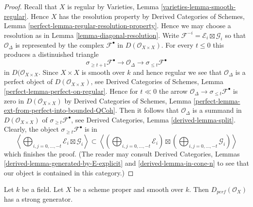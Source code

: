 \begin{proof}
Recall that $X$ is regular by
Varieties, Lemma \ref{varieties-lemma-smooth-regular}.
Hence $X$ has the resolution property by
Derived Categories of Schemes, Lemma
\ref{perfect-lemma-regular-resolution-property}.
Hence we may choose a resolution as in Lemma \ref{lemma-diagonal-resolution}.
Write $\mathcal{F}^{-i} = \mathcal{E}_i \boxtimes \mathcal{G}_i$
so that $\mathcal{O}_\Delta$ is represented by the complex
$\mathcal{F}^\bullet$ in $D(\mathcal{O}_{X \times X})$.
For every $t \leq 0$ this produces a distinuished triangle
$$
\sigma_{\geq t + 1}\mathcal{F}^\bullet \to
\mathcal{O}_\Delta \to \sigma_{\leq t}\mathcal{F}^\bullet
$$
in $D(\mathcal{O}_{X \times X}$. Since $X \times X$ is smooth over $k$
and hence regular we see that $\mathcal{O}_\Delta$ is a perfect object of
$D(\mathcal{O}_{X \times X})$, see
Derived Categories of Schemes, Lemma \ref{perfect-lemma-perfect-on-regular}.
Hence for $t \ll 0$ the arrow
$\mathcal{O}_\Delta \to \sigma_{\leq t}\mathcal{F}^\bullet$
is zero in $D(\mathcal{O}_{X \times X})$ by
Derived Categories of Schemes, Lemma
\ref{perfect-lemma-ext-from-perfect-into-bounded-QCoh}.
Then it follows that $\mathcal{O}_\Delta$ is a summand
in $D(\mathcal{O}_{X \times X})$
of $\sigma_{\geq t}\mathcal{F}^\bullet$, see
Derived Categories, Lemma \ref{derived-lemma-split}.
Clearly, the object $\sigma_{\geq t}\mathcal{F}^\bullet$
is in
$$
\left\langle
\bigoplus\nolimits_{i, j = 0, \ldots, -t} \mathcal{E}_i \boxtimes \mathcal{G}_i
\right\rangle
\subset
\left\langle
\left(\bigoplus\nolimits_{i, j = 0, \ldots, -t} \mathcal{E}_i\right)
\boxtimes
\left(\bigoplus\nolimits_{i, j = 0, \ldots, -t} \mathcal{G}_i\right)
\right\rangle
$$
which finishes the proof. (The reader may consult
Derived Categories, Lemmas \ref{derived-lemma-generated-by-E-explicit} and
\ref{derived-lemma-in-cone-n} to see that our object is contained in this
category.)
\end{proof}

\begin{lemma}
\label{lemma-smooth-proper-strong-generator}
Let $k$ be a field. Let $X$ be a scheme proper and smooth over $k$.
Then $D_{perf}(\mathcal{O}_X)$
has a strong generator.
\end{lemma}

